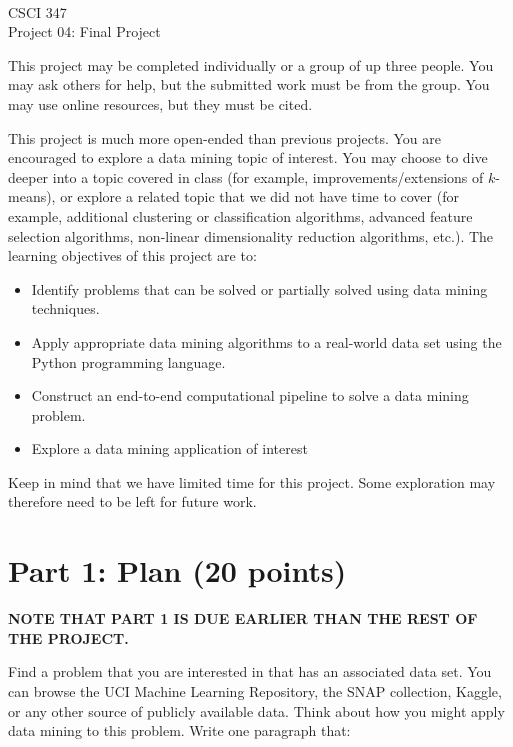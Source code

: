 \documentclass[11pt]{article}
\newcommand{\course}{CSCI 347}
\newcommand{\proj}{Project 04: Final Project}
\begin{document}
{ ~\\
    \course \\ 
    \proj \\ 
}

This project may be completed individually or a group of up three people. You
may ask others for help, but the submitted work must be from the group. You may
use online resources, but they must be cited.

This project is much more open-ended than previous projects. You are encouraged
to explore a data mining topic of interest. You may choose to dive deeper into a
topic covered in class (for example, improvements/extensions of $k$-means), or
explore a related topic that we did not have time to cover (for example,
additional clustering or classification algorithms, advanced feature selection
algorithms, non-linear dimensionality reduction algorithms, etc.). The learning
objectives of this project are to:

\begin{itemize}

    \item Identify problems that can be solved or partially solved using data
    mining techniques.

    \item Apply appropriate data mining algorithms to a real-world data set
    using the Python programming language.

    \item Construct an end-to-end computational pipeline to solve a data mining
    problem.

    \item Explore a data mining application of interest

\end{itemize}

Keep in mind that we have limited time for this project. Some exploration may
therefore need to be left for future work.

\section*{Part 1: Plan (20 points)}

{\bf NOTE THAT PART 1 IS DUE EARLIER THAN THE REST OF THE PROJECT.}
\linebreak

Find a problem that you are interested in that has an associated data set. You
can browse the UCI Machine Learning Repository, the SNAP collection, Kaggle, or
any other source of publicly available data. Think about how you might apply
data mining to this problem. Write one paragraph that:
\end{document}
